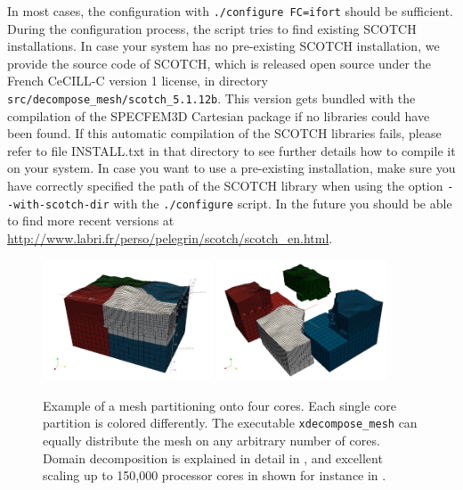 In most cases, the configuration with \texttt{./configure~FC=ifort}
should be sufficient. During the configuration process, the script
tries to find existing SCOTCH installations. In case your system has
no pre-existing SCOTCH installation, we provide the source code of
SCOTCH, which is released open source under the French CeCILL-C version
1 license, in directory \texttt{src/decompose\_mesh/scotch\_5.1.12b}.
This version gets bundled with the compilation of the SPECFEM3D Cartesian
package if no libraries could have been found. If this automatic compilation
of the SCOTCH libraries fails, please refer to file INSTALL.txt in
that directory to see further details how to compile it on your system.
In case you want to use a pre-existing installation, make sure you
have correctly specified the path of the SCOTCH library when using
the option \texttt{-{}-with-scotch-dir} with the \texttt{./configure}
script. In the future you should be able to find more recent versions
at \url{http://www.labri.fr/perso/pelegrin/scotch/scotch_en.html}.\\


\begin{figure}[htbp]
\begin{centering}
\includegraphics[width=0.45\textwidth]{figures/mount-partitions.jpg}
\includegraphics[width=0.45\textwidth]{figures/mount-partitions2.jpg}
\par
\end{centering}
\caption{Example of a mesh partitioning onto four cores. Each single core partition
is colored differently. The executable \texttt{xdecompose\_mesh} can
equally distribute the mesh on any arbitrary number of cores. Domain
decomposition is explained in detail in \citet{MaKoBlLe08}, and excellent
scaling up to 150,000 processor cores in shown for instance in
\citet{CaKoLaTiMiLeSnTr08,KoLaMi08a,MaKoBlLe08,KoErGoMi10,Kom11}.}
\label{fig:mount.partitions}
\end{figure}


